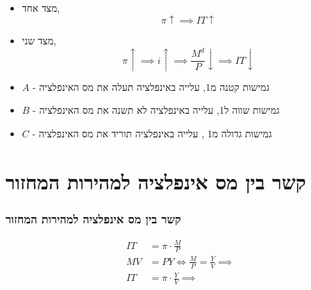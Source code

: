 \documentclass[usenames,dvipsnames]{beamer}
\begin{document}
\begin{RTL}
\begin{frame}[allowframebreaks]
    \begin{itemize}
        \item מצד אחד, $$\pi \uparrow \implies IT \uparrow$$
        \item מצד שני, $$\pi \uparrow \implies i \uparrow \implies \frac{M^d}{P} \downarrow \implies IT \downarrow$$
    \end{itemize}

    \framebreak
    \begin{center}
    \end{center}
    \begin{itemize}
        \item $A$ - גמישות קטנה מ1, עלייה באינפלציה תעלה את מס האינפלציה
        \item $B$ - גמישות שווה ל1, עלייה באינפלציה לא תשנה את מס האינפלציה
        \item $C$ - גמישות גדולה מ1 , עלייה באינפלציה תוריד את מס האינפלציה
    \end{itemize}
   

    

\end{frame}

\section{קשר בין מס אינפלציה למהירות המחזור}
\begin{frame}
    \frametitle{קשר בין מס אינפלציה למהירות המחזור}
    \begin{align*}
        IT &= \pi \cdot \frac{M}{P} \\
        MV &= PY \iff \frac{M}{P} = \frac{Y}{V} \implies \\
        IT &= \pi \cdot \frac{Y}{V} \implies
    \end{align*}


\end{frame}
\end{RTL}
\end{document}
